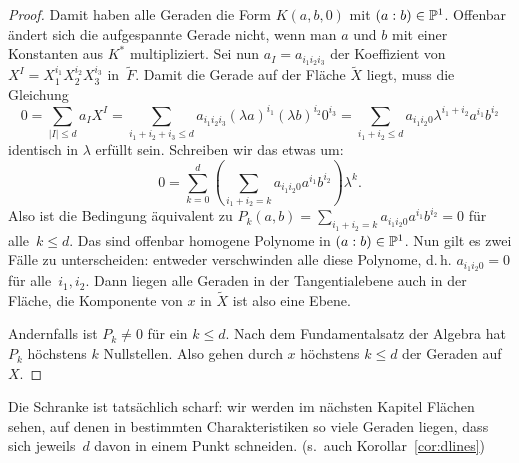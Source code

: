 \begin{proof}
Damit haben alle Geraden die Form $K(a,b,0)$ mit $(a:b) \in \mathbb P^{1}$. Offenbar ändert sich die aufgespannte Gerade nicht, wenn man $a$ und $b$ mit einer Konstanten aus $K^*$ multipliziert. Sei nun $a_I = a_{i_1 i_2 i_3}$ der Koeffizient von $X^I = X_1^{i_1} X_2^{i_2} X_3^{i_3}$ in~$\tilde F$. Damit die Gerade auf der Fläche $\tilde X$ liegt, muss die Gleichung
\begin{equation*}
0 = \sum_{|I| \leq d} a_I X^I = \sum_{i_1+i_2+i_3 \leq d} a_{i_1 i_2 i_3} (\lambda a)^{i_1} (\lambda b)^{i_2} 0^{i_3} = \sum_{i_1+i_2 \leq d} a_{i_1 i_2 0} \lambda^{i_1+i_2} a^{i_1} b^{i_2}
\end{equation*}
identisch in $\lambda$ erfüllt sein. Schreiben wir das etwas um:
\begin{equation*}
0 = \sum_{k=0}^d \left( \sum_{i_1+i_2 = k} a_{i_1 i_2 0} a^{i_1} b^{i_2} \right) \lambda^k.
\end{equation*}
Also ist die Bedingung äquivalent zu $P_k(a,b) = \sum_{i_1+i_2 = k} a_{i_1 i_2 0} a^{i_1} b^{i_2} = 0$ für alle~$k \leq d$. Das sind offenbar homogene Polynome in $(a:b) \in \mathbb P^{1}$. Nun gilt es zwei Fälle zu unterscheiden: entweder verschwinden alle diese Polynome, d.\,h. $a_{i_1 i_2 0} = 0$ für alle~$i_1, i_2$. Dann liegen alle Geraden in der Tangentialebene auch in der Fläche, die Komponente von $x$ in $\tilde X$ ist also eine Ebene.

Andernfalls ist $P_k \neq 0$ für ein $k \leq d$. Nach dem Fundamentalsatz der Algebra hat $P_k$ höchstens $k$ Nullstellen. Also gehen durch $x$ höchstens $k \leq d$ der Geraden auf $X$.
\end{proof}
\begin{remarks}
Die Schranke ist tatsächlich scharf: wir werden im nächsten Kapitel Flächen sehen, auf denen in bestimmten Charakteristiken so viele Geraden liegen, dass sich jeweils~$d$ davon in einem Punkt schneiden. (s.~auch Korollar~\ref{cor:dlines})
\end{remarks}
